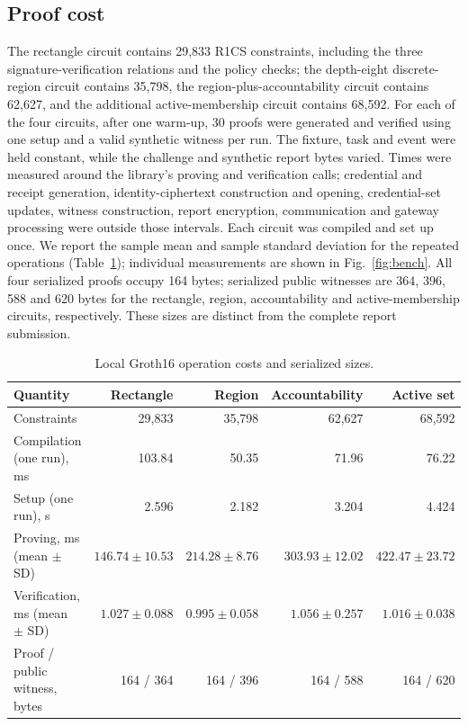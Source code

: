 \documentclass[pdflatex,iicol,sn-mathphys-num]{sn-jnl}
\begin{document}
\subsection{Proof cost}
The rectangle circuit contains 29,833 R1CS constraints, including the three signature-verification relations and the policy checks; the depth-eight discrete-region circuit contains 35,798, the region-plus-accountability circuit contains 62,627, and the additional active-membership circuit contains 68,592. For each of the four circuits, after one warm-up, 30 proofs were generated and verified using one setup and a valid synthetic witness per run. The fixture, task and event were held constant, while the challenge and synthetic report bytes varied. Times were measured around the library's proving and verification calls; credential and receipt generation, identity-ciphertext construction and opening, credential-set updates, witness construction, report encryption, communication and gateway processing were outside those intervals. Each circuit was compiled and set up once. We report the sample mean and sample standard deviation for the repeated operations (Table~\ref{tab:cost}); individual measurements are shown in Fig.~\ref{fig:bench}. All four serialized proofs occupy 164 bytes; serialized public witnesses are 364, 396, 588 and 620 bytes for the rectangle, region, accountability and active-membership circuits, respectively. These sizes are distinct from the complete report submission.

\begin{table}[t]
\centering\small\caption{Local Groth16 operation costs and serialized sizes.}\label{tab:cost}
\begin{tabular}{@{}lrrrr@{}}\toprule
Quantity & Rectangle & Region & Accountability & Active set \\\midrule
Constraints & 29,833 & 35,798 & 62,627 & 68,592 \\
Compilation (one run), ms & 103.84 & 50.35 & 71.96 & 76.22 \\
Setup (one run), s & 2.596 & 2.182 & 3.204 & 4.424 \\
Proving, ms (mean $\pm$ SD) & $146.74\pm10.53$ & $214.28\pm8.76$ & $303.93\pm12.02$ & $422.47\pm23.72$ \\
Verification, ms (mean $\pm$ SD) & $1.027\pm0.088$ & $0.995\pm0.058$ & $1.056\pm0.257$ & $1.016\pm0.038$ \\
Proof / public witness, bytes & 164 / 364 & 164 / 396 & 164 / 588 & 164 / 620 \\\bottomrule
\end{tabular}
\end{table}
\end{document}
